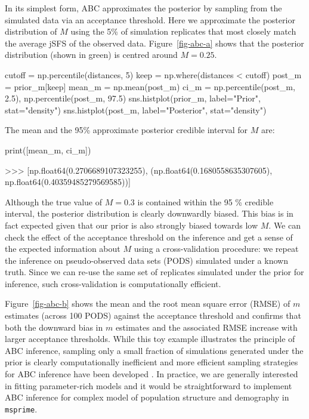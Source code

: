 \documentclass[graybox]{svmult}
\newcommand{\msprime}[0]{\texttt{msprime}}
\begin{document}
    In its simplest form, ABC approximates the posterior by sampling from
the simulated data via an acceptance threshold. Here we approximate the
posterior distribution of \(M\) using the 5\% of simulation replicates
that most closely match the average jSFS of the observed data.
Figure~\ref{fig-abc-a} shows that the posterior
distribution (shown in green) is centred around \(M=0.25\).
\begin{pythoncode}
cutoff = np.percentile(distances, 5)
keep = np.where(distances < cutoff)
post_m = prior_m[keep]
mean_m = np.mean(post_m)
ci_m = np.percentile(post_m, 2.5), np.percentile(post_m, 97.5)
sns.histplot(prior_m, label="Prior", stat="density")
sns.histplot(post_m, label="Posterior", stat="density")
\end{pythoncode}

The mean and the 95\% approximate posterior credible interval for \(M\)
are:
\begin{pythoncode}
print([mean_m, ci_m])

>>> [np.float64(0.2706689107323255),
    (np.float64(0.1680558635307605),
     np.float64(0.40359485279569585))]
\end{pythoncode}


Although the true value of \(M=0.3\) is contained within the 95 \% credible interval, the posterior distribution is clearly downwardly biased. This bias is in fact expected given that our prior is also strongly biased towards low \(M\). We can check the effect of the acceptance threshold on the inference and get a sense of the expected information about \(M\) using a cross-validation procedure: we repeat the inference on pseudo-observed data sets (PODS) simulated under a known truth. Since we can re-use the same set of replicates simulated under the prior for inference, such cross-validation is computationally efficient.

Figure~\ref{fig-abc-b} shows the mean and the root mean square error (RMSE) of \(m\) estimates (across 100 PODS) against the acceptance threshold and confirms that both the downward bias in \(m\) estimates and the associated RMSE increase with larger acceptance thresholds. While this toy example illustrates the principle of ABC inference, sampling only a small fraction of simulations generated under the prior is clearly computationally inefficient and more efficient sampling strategies for ABC inference have been developed \citep{Beaumont2002}. In practice, we are generally interested in fitting parameter-rich models and it would be straightforward to implement ABC inference for complex model of population structure and demography in \msprime.
\end{document}
